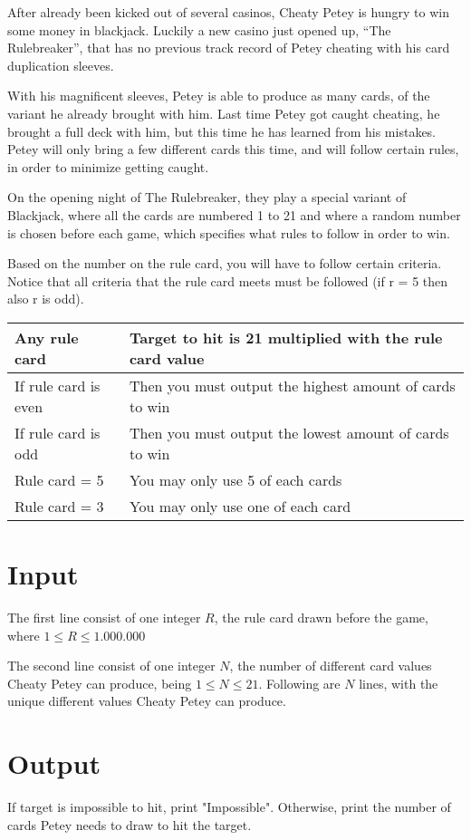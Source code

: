 
After already been kicked out of several casinos, Cheaty Petey is hungry to win some money in blackjack. Luckily a new casino just opened up, “The Rulebreaker”, that has no previous track record of Petey cheating with his card duplication sleeves.

With his magnificent sleeves, Petey is able to produce as many cards, of the variant he already brought with him. Last time Petey got caught cheating, he brought a full deck with him, but this time he has learned from his mistakes. Petey will only bring a few different cards this time, and will follow certain rules, in order to minimize getting caught.

On the opening night of The Rulebreaker, they play a special variant of Blackjack, where all the cards are numbered 1 to 21 and where a random number is chosen before each game, which specifies what rules to follow in order to win. 

Based on the number on the rule card, you will have to follow certain criteria. Notice that all criteria that the rule card meets must be followed (if r = 5 then also r is odd). 


\begin{tabular}{|ll|}
\hline
\textbf{Any rule card} & \textbf{Target to hit is 21 multiplied with the rule card value} \\ \hline
If rule card is even & Then you must output the highest amount of cards to win \\ \hline
If rule card is odd   & Then you must output the lowest amount of cards to win  \\ \hline
Rule card = 5         & You may only use 5 of each cards                        \\ \hline
Rule card = 3         & You may only use one of each card                       \\ \hline
\end{tabular}



\section*{Input}
The first line consist of one integer $R$, the rule card drawn before the game, where 
$1\leq R \leq 1.000.000$

The second line consist of one integer $N$, the number of different card values Cheaty Petey can produce, being $1\leq N \leq 21$. Following are $N$ lines, with the unique different values Cheaty Petey can produce.

\section*{Output}
If target is impossible to hit, print "Impossible". Otherwise, print the number of cards Petey needs to draw to hit the target.
